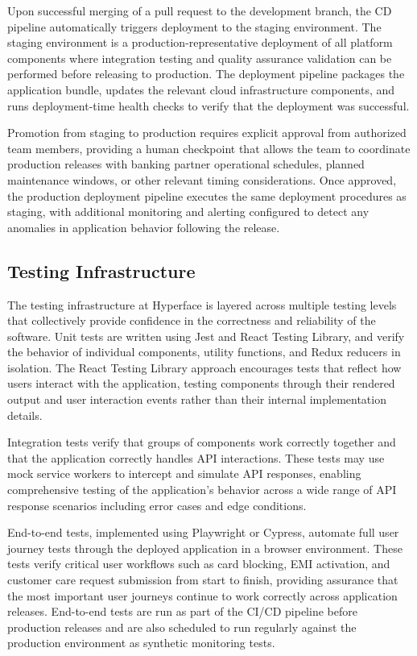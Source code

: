Upon successful merging of a pull request to the development branch, the CD pipeline automatically triggers deployment to the staging environment. The staging environment is a production-representative deployment of all platform components where integration testing and quality assurance validation can be performed before releasing to production. The deployment pipeline packages the application bundle, updates the relevant cloud infrastructure components, and runs deployment-time health checks to verify that the deployment was successful.

Promotion from staging to production requires explicit approval from authorized team members, providing a human checkpoint that allows the team to coordinate production releases with banking partner operational schedules, planned maintenance windows, or other relevant timing considerations. Once approved, the production deployment pipeline executes the same deployment procedures as staging, with additional monitoring and alerting configured to detect any anomalies in application behavior following the release.

\subsection{Testing Infrastructure}

The testing infrastructure at Hyperface is layered across multiple testing levels that collectively provide confidence in the correctness and reliability of the software. Unit tests are written using Jest and React Testing Library, and verify the behavior of individual components, utility functions, and Redux reducers in isolation. The React Testing Library approach encourages tests that reflect how users interact with the application, testing components through their rendered output and user interaction events rather than their internal implementation details.

Integration tests verify that groups of components work correctly together and that the application correctly handles API interactions. These tests may use mock service workers to intercept and simulate API responses, enabling comprehensive testing of the application's behavior across a wide range of API response scenarios including error cases and edge conditions.

End-to-end tests, implemented using Playwright or Cypress, automate full user journey tests through the deployed application in a browser environment. These tests verify critical user workflows such as card blocking, EMI activation, and customer care request submission from start to finish, providing assurance that the most important user journeys continue to work correctly across application releases. End-to-end tests are run as part of the CI/CD pipeline before production releases and are also scheduled to run regularly against the production environment as synthetic monitoring tests.

